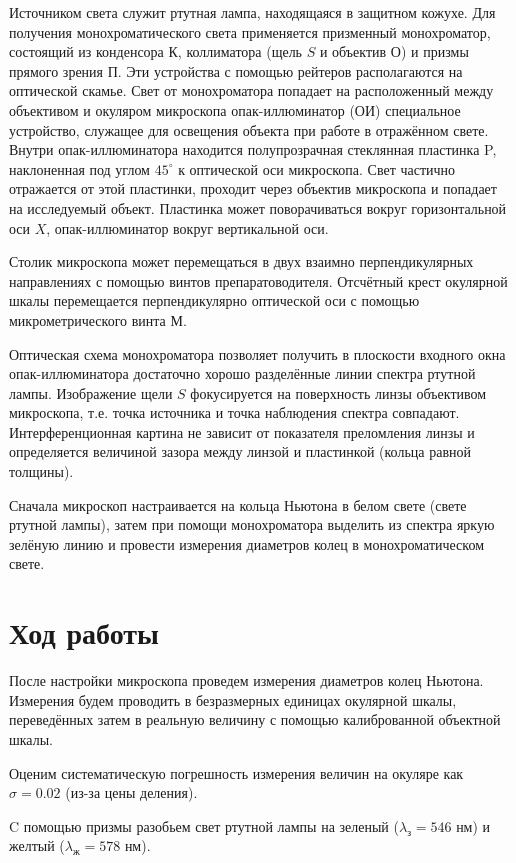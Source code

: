 \documentclass[a4paper,12pt]{article}
\begin{document}
Источником света служит ртутная лампа, находящаяся в защитном кожухе. Для получения монохроматического света применяется призменный монохроматор, состоящий из конденсора $ К $, коллиматора (щель $ S $ и объектив $ О $) и призмы прямого зрения $ П $. Эти устройства с помощью рейтеров располагаются на оптической скамье. Свет от монохроматора попадает на расположенный между объективом и окуляром микроскопа опак-иллюминатор (ОИ)  специальное устройство, служащее для освещения объекта при работе в отражённом свете. Внутри опак-иллюминатора находится полупрозрачная стеклянная пластинка P, наклоненная под углом $ 45^\circ $ к оптической оси микроскопа. Свет частично отражается от этой пластинки, проходит через объектив микроскопа и попадает на исследуемый объект. Пластинка может поворачиваться вокруг горизонтальной оси $ X $, опак-иллюминатор вокруг вертикальной оси.

Столик микроскопа может перемещаться в двух взаимно перпендикулярных направлениях с помощью винтов препаратоводителя. Отсчётный крест окулярной шкалы перемещается перпендикулярно оптической оси с помощью микрометрического винта $ М $.

Оптическая схема монохроматора позволяет получить в плоскости входного окна опак-иллюминатора достаточно хорошо разделённые линии спектра ртутной лампы. Изображение щели $ S $ фокусируется на поверхность линзы объективом микроскопа, т.е. точка источника и точка наблюдения спектра совпадают. Интерференционная картина не зависит от показателя преломления линзы и определяется величиной зазора между линзой и пластинкой (кольца равной толщины).

Сначала микроскоп настраивается на кольца Ньютона в белом свете (свете ртутной лампы), затем при помощи монохроматора выделить из спектра яркую зелёную линию и провести измерения диаметров колец в монохроматическом свете. 


\section*{Ход работы}

После настройки микроскопа проведем измерения диаметров колец Ньютона. Измерения будем проводить в безразмерных единицах окулярной шкалы, переведённых затем в реальную величину с помощью калиброванной объектной шкалы. 


Оценим систематическую погрешность измерения величин на окуляре как $ \sigma = 0.02 $ (из-за цены деления).

C помощью призмы разобьем свет ртутной лампы на зеленый ($ \lambda_\text{з} = 546 $ нм) и желтый ($ \lambda_\text{ж} = 578  $ нм).
\end{document}
